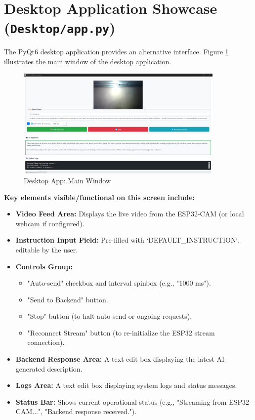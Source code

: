 \documentclass[12pt, a4paper]{report}
\begin{document}
\section{Desktop Application Showcase (\texttt{Desktop/app.py})}
The PyQt6 desktop application provides an alternative interface.
Figure \ref{fig:desktop-main-screen} illustrates the main window of the desktop application.
\begin{figure}[H]
    \centering
    \includegraphics[width=0.9\textwidth]{fig/desktop-main.png}
    \caption{Desktop App: Main Window}
    \label{fig:desktop-main-screen}
\end{figure}
\textbf{Key elements visible/functional on this screen include:}
\begin{itemize}
    \item \textbf{Video Feed Area:} Displays the live video from the ESP32-CAM (or local webcam if configured).
    \item \textbf{Instruction Input Field:} Pre-filled with `DEFAULT\_INSTRUCTION`, editable by the user.
    \item \textbf{Controls Group:}
        \begin{itemize}
            \item "Auto-send" checkbox and interval spinbox (e.g., "1000 ms").
            \item "Send to Backend" button.
            \item "Stop" button (to halt auto-send or ongoing requests).
            \item "Reconnect Stream" button (to re-initialize the ESP32 stream connection).
        \end{itemize}
    \item \textbf{Backend Response Area:} A text edit box displaying the latest AI-generated description.
    \item \textbf{Logs Area:} A text edit box displaying system logs and status messages.
    \item \textbf{Status Bar:} Shows current operational status (e.g., "Streaming from ESP32-CAM...", "Backend response received.").
\end{itemize}
\end{document}
